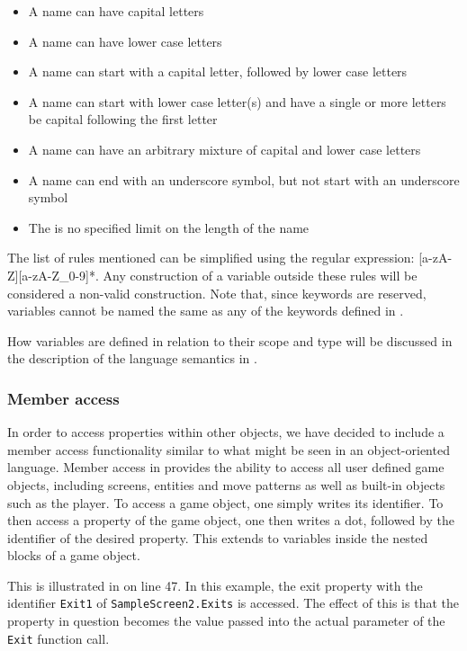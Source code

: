 \begin{itemize}
    \item A name can have capital letters
    \item A name can have lower case letters
    \item A name can start with a capital letter, followed by lower case letters
    \item A name can start with lower case letter(s) and have a single or more letters be capital following the first letter
    \item A name can have an arbitrary mixture of capital and lower case letters
    \item A name can end with an underscore symbol, but not start with an underscore symbol
    \item The is no specified limit on the length of the name
\end{itemize}

The list of rules mentioned can be simplified using the regular expression: [a-zA-Z][a-zA-Z\_0-9]*. Any construction of a variable outside these rules will be considered
a non-valid construction. Note that, since keywords are reserved, variables cannot be named the same as any of the keywords defined in .

How variables are defined in relation to their scope and type will be discussed in the description of the language semantics in .

\subsubsection*{Member access}
In order to access properties within other objects, we have decided to include a member access functionality similar to what might be seen in an
object-oriented language. Member access in \dazel{} provides the ability to access all user defined game objects, including screens, entities and move patterns as well
as built-in objects such as the player. To access a game object, one simply writes its identifier. To then access a property of the game object, one then writes
a dot, followed by the identifier of the desired property. This extends to variables inside the nested blocks of a game object.

This is illustrated in  on line 47. In this example, the exit property with the identifier \texttt{Exit1} of \texttt{SampleScreen2.Exits} is accessed.
The effect of this is that the property in question becomes the value passed into the actual parameter of the \texttt{Exit} function call.


